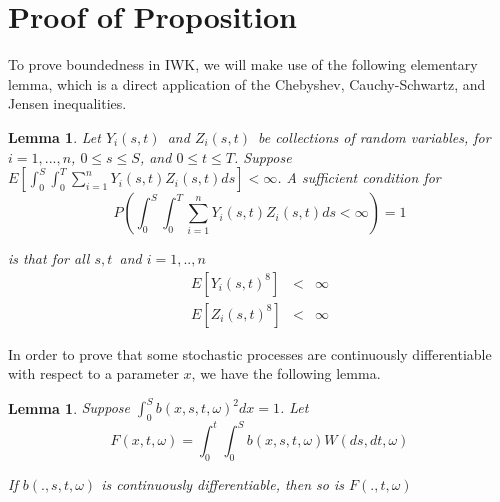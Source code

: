 \documentclass{article}
\newtheorem{lemma}[theorem]{Lemma}
\begin{document}
\appendix
\section{Proof of Proposition}

To prove boundedness in IWK, we will make use of the following elementary
lemma, which is a direct application of the Chebyshev, Cauchy-Schwartz, and
Jensen inequalities.


\begin{lemma}\label{lemma::differentiable_F}
\textit{Let }$Y_{i}(s,t)$\textit{\ and }$Z_{i}(s,t)$\textit{\ be collections
of random variables, for }$i=1,...,n$\textit{, }$0\leq s\leq S$\textit{, and
}$0\leq t\leq T$\textit{. Suppose }$E[\int_{0}^{S}\int_{0}^{T}%
\sum_{i=1}^{n}Y_{i}(s,t)Z_{i}(s,t)ds]<\infty $\textit{. A sufficient
condition for }%
\begin{equation*}
P(\int_{0}^{S}\int_{0}^{T}\sum_{i=1}^{n}Y_{i}(s,t)Z_{i}(s,t)ds<\infty )=1
\end{equation*}

\textit{is that for all }$s,t$\textit{\ and }$i=1,..,n$%
\begin{eqnarray*}
E[Y_{i}(s,t)^{8}] &<&\infty \\
E[Z_{i}(s,t)^{8}] &<&\infty
\end{eqnarray*}
\end{lemma}

In order to prove that some stochastic processes are continuously
differentiable with respect to a parameter $x$, we have the following lemma.

\bigskip


\begin{lemma}\label{lemma::differentiable_F}
Suppose $\int_{0}^{S}b(x,s,t,\omega )^{2}dx=1$. Let
\begin{equation*}
F(x,t,\omega )=\int_{0}^{t}\int_{0}^{S}b(x,s,t,\omega )W(ds,dt,\omega )
\end{equation*}

If $b(.,s,t,\omega )$ is continuously differentiable, then so is $%
F(.,t,\omega )$
\end{lemma}
\end{document}
